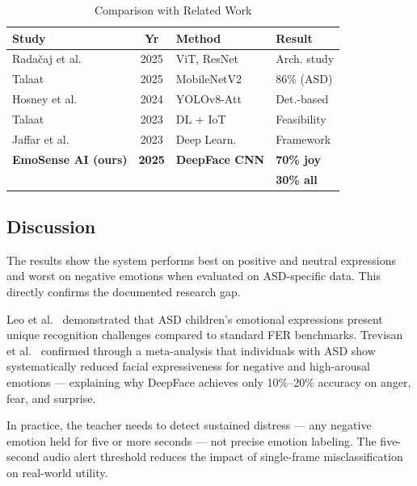 \documentclass[conference]{IEEEtran}
\begin{document}
\begin{table}[h]
\centering
\caption{Comparison with Related Work}
\label{tab:comparison}
\renewcommand{\arraystretch}{1.3}
\begin{tabular}{|l|c|l|l|}
\hline
\textbf{Study} & \textbf{Yr} & \textbf{Method} & \textbf{Result} \\
\hline
Rada\v{c}aj et al.~\cite{radocaj2025} & 2025 & ViT, ResNet & Arch. study \\
\hline
Talaat~\cite{talaat2025}              & 2025 & MobileNetV2 & 86\% (ASD) \\
\hline
Hosney et al.~\cite{hosney2024}       & 2024 & YOLOv8-Att  & Det.-based \\
\hline
Talaat~\cite{talaat2023}              & 2023 & DL + IoT    & Feasibility \\
\hline
Jaffar et al.~\cite{jaffar2023}       & 2023 & Deep Learn. & Framework \\
\hline
\textbf{EmoSense AI (ours)}           & \textbf{2025} & \textbf{DeepFace CNN} & \textbf{70\% joy} \\
                                      &               &                       & \textbf{30\% all} \\
\hline
\end{tabular}
\end{table}

\subsection{Discussion}

The results show the system performs best on positive and
neutral expressions and worst on negative emotions when
evaluated on ASD-specific data. This directly confirms the
documented research gap.

Leo et al.~\cite{leo2015} demonstrated that ASD children's
emotional expressions present unique recognition challenges
compared to standard FER benchmarks. Trevisan et
al.~\cite{trevisan2018} confirmed through a meta-analysis
that individuals with ASD show systematically reduced
facial expressiveness for negative and high-arousal
emotions --- explaining why DeepFace achieves only
10\%--20\% accuracy on anger, fear, and surprise.

In practice, the teacher needs to detect sustained distress
--- any negative emotion held for five or more seconds ---
not precise emotion labeling. The five-second audio alert
threshold reduces the impact of single-frame
misclassification on real-world utility.
\end{document}
